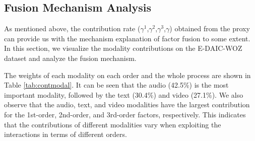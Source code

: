 \documentclass{article}
\begin{document}
\begin{table}[!t]
   	\centering
   	\caption{Result of Factor Order Ablation Study, where the best results are marked in bold.}
   	\label{tab:aborder}
\end{table}

		
\subsection{Fusion Mechanism Analysis}
As mentioned above, the contribution rate ($\gamma^1$,$\gamma^2$,$\gamma^3$,$\gamma$) obtained from the proxy can provide us with the mechanism explanation of factor fusion to some extent. In this section, we visualize the modality contributions on the E-DAIC-WOZ dataset and analyze the fusion mechanism.

The weights of each modality on each order and the whole process are shown in Table \ref{tab:contmodal}. It can be seen that the audio (42.5\%) is the most important modality, followed by the text (30.4\%) and video (27.1\%). We also observe that the audio, text, and video modalities have the largest contribution for the 1st-order, 2nd-order, and 3rd-order factors, respectively.
This indicates that the contributions of different modalities vary when exploiting the interactions in terms of different orders.
\end{document}

